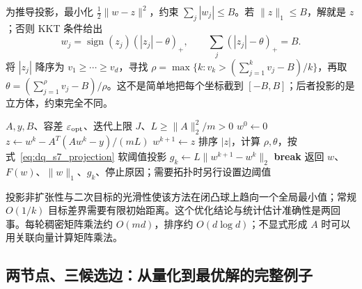 为推导投影，最小化 $\frac12\|w-z\|^2$，约束 $\sum_j|w_j|\le B$。若 $\|z\|_1\le B$，解就是 $z$；否则 KKT 条件给出
\begin{equation}
 w_j=\operatorname{sign}(z_j)(|z_j|-\theta)_+,
 \qquad \sum_j(|z_j|-\theta)_+=B.
 \label{eq:dq_s7_projection}
\end{equation}
将 $|z_j|$ 降序为 $v_1\ge\cdots\ge v_d$，寻找
$\rho=\max\{k:v_k>(\sum_{j=1}^kv_j-B)/k\}$，再取
$\theta=(\sum_{j=1}^{\rho}v_j-B)/\rho$。这不是简单地把每个坐标截到 $[-B,B]$；后者投影的是立方体，约束完全不同。

\begin{algorithm}[tbp]
\caption{S7 约束估计器的教学实现：投影梯度}
\label{alg:dq_s7_pg}
\begin{algorithmic}[1]
\Require $A,y,B$、容差 $\varepsilon_{\rm opt}$、迭代上限 $J$、$L\ge\|A\|_2^2/m>0$
\State $w^0\gets0$
 \State $z\gets w^k-A^T(Aw^k-y)/(mL)$
   \State $w^{k+1}\gets z$
 \Else
   \State 排序 $|z|$，计算 $\rho,\theta$，按式~\eqref{eq:dq_s7_projection} 软阈值投影
 \EndIf
 \State $g_k\gets L\|w^{k+1}-w^k\|_2$
   \State \textbf{break}
 \EndIf
\EndFor
\State 返回 $w$、$F(w)$、$\|w\|_1$、$g_k$、停止原因；需要拓扑时另行设置边阈值
\end{algorithmic}
\end{algorithm}

投影非扩张性与二次目标的光滑性使该方法在闭凸球上趋向一个全局最小值；常规 $O(1/k)$ 目标差界需要有限初始距离。这个优化结论与统计估计准确性是两回事。每轮稠密矩阵乘法约 $O(md)$，排序约 $O(d\log d)$；不显式形成 $A$ 时可以用关联向量计算矩阵乘法。

\subsection{两节点、三候选边：从量化到最优解的完整例子}

